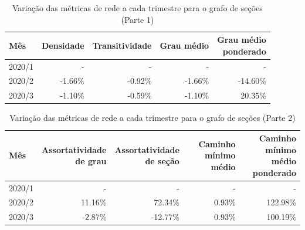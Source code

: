 \begin{table}[htb]
\centering
\caption{Variação das métricas de rede a cada trimestre para o grafo de seções (Parte 1)}
\label{tab:metricas-redes-pandemia:grafo-trimestral-por-secao1}
\begin{tabular}{l|rrrr}
\toprule
Mês & Densidade & Transitividade & Grau médio & \shortstack{Grau médio\\ponderado} \\
\midrule
2020/1 & - & - & - & - \\
2020/2 & -1.66\% & -0.92\% & -1.66\% & -14.60\% \\
2020/3 & -1.10\% & -0.59\% & -1.10\% &  20.35\% \\
\bottomrule
\end{tabular}
\fdadospesquisa
\end{table}

\begin{table}[htb]
\centering
\caption{Variação das métricas de rede a cada trimestre para o grafo de seções (Parte 2)}
\label{tab:metricas-redes-pandemia:grafo-trimestral-por-secao2}
\begin{tabular}{l|rrrr}
\toprule
Mês & \shortstack{Assortatividade\\de grau} & \shortstack{Assortatividade\\de seção} & \shortstack{Caminho mínimo\\médio} & \shortstack{Caminho mínimo\\médio ponderado} \\
\midrule
2020/1 & - & - & - & - \\
2020/2 & 11.16\% &  72.34\% & 0.93\% & 122.98\% \\
2020/3 & -2.87\% & -12.77\% & 0.93\% & 100.19\% \\
\bottomrule
\end{tabular}
\fdadospesquisa
\end{table}

